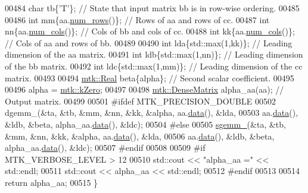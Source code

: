 \begin{DoxyCode}
00484   \textcolor{keywordtype}{char} tb\{\textcolor{charliteral}{'T'}\}; \textcolor{comment}{// State that input matrix bb is in row-wise ordering.}
00485 
00486   \textcolor{keywordtype}{int} mm\{aa.\hyperlink{classmtk_1_1DenseMatrix_a53f3afb3b6a8d21854458aaa9663cc74}{num\_rows}()\};  \textcolor{comment}{// Rows of aa and rows of cc.}
00487   \textcolor{keywordtype}{int} nn\{aa.\hyperlink{classmtk_1_1DenseMatrix_a41747502d468c6728a4be31501b16e0e}{num\_cols}()\};  \textcolor{comment}{// Cols of bb and cols of cc.}
00488   \textcolor{keywordtype}{int} kk\{aa.\hyperlink{classmtk_1_1DenseMatrix_a41747502d468c6728a4be31501b16e0e}{num\_cols}()\};  \textcolor{comment}{// Cols of aa and rows of bb.}
00489 
00490   \textcolor{keywordtype}{int} lda\{std::max(1,kk)\};  \textcolor{comment}{// Leading dimension of the aa matrix.}
00491   \textcolor{keywordtype}{int} ldb\{std::max(1,nn)\};  \textcolor{comment}{// Leading dimension of the bb matrix.}
00492   \textcolor{keywordtype}{int} ldc\{std::max(1,mm)\};  \textcolor{comment}{// Leading dimension of the cc matrix.}
00493 
00494   \hyperlink{group__c01-roots_gac080bbbf5cbb5502c9f00405f894857d}{mtk::Real} beta\{alpha\}; \textcolor{comment}{// Second scalar coefficient.}
00495 
00496   alpha = \hyperlink{group__c01-roots_ga59a451a5fae30d59649bcda274fea271}{mtk::kZero};
00497 
00498   \hyperlink{classmtk_1_1DenseMatrix}{mtk::DenseMatrix} alpha\_aa(aa); \textcolor{comment}{// Output matrix.}
00499 
00501 \textcolor{preprocessor}{  #ifdef MTK\_PRECISION\_DOUBLE}
00502   dgemm\_(&ta, &tb, &mm, &nn, &kk, &alpha, aa.\hyperlink{classmtk_1_1DenseMatrix_a0c33b8a9e01d157c61ddbdf807c25d84}{data}(), &lda,
00503          aa.\hyperlink{classmtk_1_1DenseMatrix_a0c33b8a9e01d157c61ddbdf807c25d84}{data}(), &ldb, &beta, alpha\_aa.\hyperlink{classmtk_1_1DenseMatrix_a0c33b8a9e01d157c61ddbdf807c25d84}{data}(), &ldc);
00504 \textcolor{preprocessor}{  #else}
00505   \hyperlink{namespacemtk_adb7c0560326b8e57f255e58b87ec76b0}{sgemm\_}(&ta, &tb, &mm, &nn, &kk, &alpha, aa.\hyperlink{classmtk_1_1DenseMatrix_a0c33b8a9e01d157c61ddbdf807c25d84}{data}(), &lda,
00506          aa.\hyperlink{classmtk_1_1DenseMatrix_a0c33b8a9e01d157c61ddbdf807c25d84}{data}(), &ldb, &beta, alpha\_aa.\hyperlink{classmtk_1_1DenseMatrix_a0c33b8a9e01d157c61ddbdf807c25d84}{data}(), &ldc);
00507 \textcolor{preprocessor}{  #endif}
00508 
00509 \textcolor{preprocessor}{  #if MTK\_VERBOSE\_LEVEL > 12}
00510   std::cout << \textcolor{stringliteral}{"alpha\_aa ="} << std::endl;
00511   std::cout << alpha\_aa << std::endl;
00512 \textcolor{preprocessor}{  #endif}
00513 
00514   \textcolor{keywordflow}{return} alpha\_aa;
00515 \}
\end{DoxyCode}

